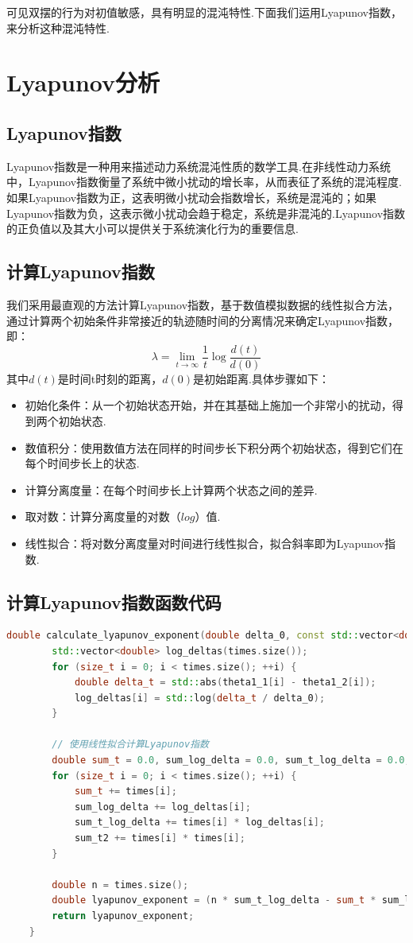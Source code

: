 \documentclass[12pt, a4paper, oneside]{article}
\begin{document}
可见双摆的行为对初值敏感，具有明显的混沌特性.下面我们运用Lyapunov指数，来分析这种混沌特性.
\section{Lyapunov分析}
\subsection{Lyapunov指数}
Lyapunov指数是一种用来描述动力系统混沌性质的数学工具.在非线性动力系统中，Lyapunov指数衡量了系统中微小扰动的增长率，从而表征了系统的混沌程度.如果Lyapunov指数为正，这表明微小扰动会指数增长，系统是混沌的；如果Lyapunov指数为负，这表示微小扰动会趋于稳定，系统是非混沌的.Lyapunov指数的正负值以及其大小可以提供关于系统演化行为的重要信息.
\subsection{计算Lyapunov指数}
我们采用最直观的方法计算Lyapunov指数，基于数值模拟数据的线性拟合方法，通过计算两个初始条件非常接近的轨迹随时间的分离情况来确定Lyapunov指数，即：\[\lambda = \lim_{t \to \infty} \frac{1}{t}\log\frac{d(t)}{d(0)}\]其中$d(t)$是时间t时刻的距离，$d(0)$是初始距离.具体步骤如下：
\begin{itemize}
	\item 初始化条件：从一个初始状态开始，并在其基础上施加一个非常小的扰动，得到两个初始状态.
	\item 数值积分：使用数值方法在同样的时间步长下积分两个初始状态，得到它们在每个时间步长上的状态.
	\item 计算分离度量：在每个时间步长上计算两个状态之间的差异.
	\item 取对数：计算分离度量的对数（$log$）值.
	\item 线性拟合：将对数分离度量对时间进行线性拟合，拟合斜率即为Lyapunov指数.
\end{itemize}
\subsection{计算Lyapunov指数函数代码}
\begin{lstlisting}[language = C++, name = calculate_lyapunov_exponent]
		double calculate_lyapunov_exponent(double delta_0, const std::vector<double>& times, const std::vector<double>& theta1_1, const std::vector<double>& theta1_2) {
		std::vector<double> log_deltas(times.size());
		for (size_t i = 0; i < times.size(); ++i) {
			double delta_t = std::abs(theta1_1[i] - theta1_2[i]);
			log_deltas[i] = std::log(delta_t / delta_0);
		}

		// 使用线性拟合计算Lyapunov指数
		double sum_t = 0.0, sum_log_delta = 0.0, sum_t_log_delta = 0.0, sum_t2 = 0.0;
		for (size_t i = 0; i < times.size(); ++i) {
			sum_t += times[i];
			sum_log_delta += log_deltas[i];
			sum_t_log_delta += times[i] * log_deltas[i];
			sum_t2 += times[i] * times[i];
		}

		double n = times.size();
		double lyapunov_exponent = (n * sum_t_log_delta - sum_t * sum_log_delta) / (n * sum_t2 - sum_t * sum_t);
		return lyapunov_exponent;
	}
\end{lstlisting}
\end{document}
